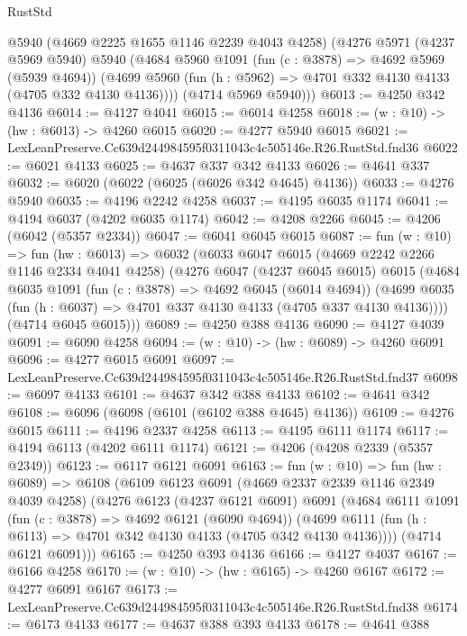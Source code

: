 \begin{lexlean}{RustStd}
\begin{coremodule}
      @5940
      (@4669 @2225 @1655 @1146 @2239 @4043 @4258)
      (@4276
        @5971
        (@4237 @5969 @5940)
        @5940
        (@4684
          @5960
          @1091
          (fun (c : @3878) => @4692 @5969 (@5939 @4694))
          (@4699 @5960 (fun (h : @5962) => @4701 @332 @4130 @4133 (@4705 @332 @4130 @4136))))
        (@4714 @5969 @5940)))
@6013 := @4250 @342 @4136
@6014 := @4127 @4041
@6015 := @6014 @4258
@6018 := (w : @10) -> (hw : @6013) -> @4260 @6015
@6020 := @4277 @5940 @6015
@6021 := LexLeanPreserve.Cc639d244984595f0311043c4c505146e.R26.RustStd.fnd36
@6022 := @6021 @4133
@6025 := @4637 @337 @342 @4133
@6026 := @4641 @337
@6032 := @6020 (@6022 (@6025 (@6026 @342 @4645) @4136))
@6033 := @4276 @5940
@6035 := @4196 @2242 @4258
@6037 := @4195 @6035 @1174
@6041 := @4194 @6037 (@4202 @6035 @1174)
@6042 := @4208 @2266
@6045 := @4206 (@6042 (@5357 @2334))
@6047 := @6041 @6045 @6015
@6087 := fun (w : @10) =>
  fun (hw : @6013) =>
  @6032
    (@6033
      @6047
      @6015
      (@4669 @2242 @2266 @1146 @2334 @4041 @4258)
      (@4276
        @6047
        (@4237 @6045 @6015)
        @6015
        (@4684
          @6035
          @1091
          (fun (c : @3878) => @4692 @6045 (@6014 @4694))
          (@4699 @6035 (fun (h : @6037) => @4701 @337 @4130 @4133 (@4705 @337 @4130 @4136))))
        (@4714 @6045 @6015)))
@6089 := @4250 @388 @4136
@6090 := @4127 @4039
@6091 := @6090 @4258
@6094 := (w : @10) -> (hw : @6089) -> @4260 @6091
@6096 := @4277 @6015 @6091
@6097 := LexLeanPreserve.Cc639d244984595f0311043c4c505146e.R26.RustStd.fnd37
@6098 := @6097 @4133
@6101 := @4637 @342 @388 @4133
@6102 := @4641 @342
@6108 := @6096 (@6098 (@6101 (@6102 @388 @4645) @4136))
@6109 := @4276 @6015
@6111 := @4196 @2337 @4258
@6113 := @4195 @6111 @1174
@6117 := @4194 @6113 (@4202 @6111 @1174)
@6121 := @4206 (@4208 @2339 (@5357 @2349))
@6123 := @6117 @6121 @6091
@6163 := fun (w : @10) =>
  fun (hw : @6089) =>
  @6108
    (@6109
      @6123
      @6091
      (@4669 @2337 @2339 @1146 @2349 @4039 @4258)
      (@4276
        @6123
        (@4237 @6121 @6091)
        @6091
        (@4684
          @6111
          @1091
          (fun (c : @3878) => @4692 @6121 (@6090 @4694))
          (@4699 @6111 (fun (h : @6113) => @4701 @342 @4130 @4133 (@4705 @342 @4130 @4136))))
        (@4714 @6121 @6091)))
@6165 := @4250 @393 @4136
@6166 := @4127 @4037
@6167 := @6166 @4258
@6170 := (w : @10) -> (hw : @6165) -> @4260 @6167
@6172 := @4277 @6091 @6167
@6173 := LexLeanPreserve.Cc639d244984595f0311043c4c505146e.R26.RustStd.fnd38
@6174 := @6173 @4133
@6177 := @4637 @388 @393 @4133
@6178 := @4641 @388

\end{coremodule}
\end{lexlean}
